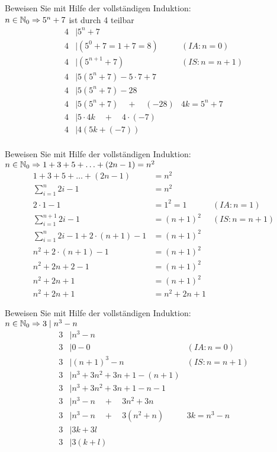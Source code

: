 \begin{card}
  Beweisen Sie mit Hilfe der vollständigen Induktion:\\
  $n \in \mathbb{N}_0 \Rightarrow 5^n + 7$ ist durch 4 teilbar
  \hr
  \begin{align*}
    4 &\mid 5^n + 7 \\
    4 &\mid (5^0 + 7 = 1+7 = 8) & (IA: n=0) \\
    4 &\mid (5^{n+1} + 7) & (IS: n=n+1) \\
    4 &\mid 5 (5^n + 7) - 5 \cdot 7 + 7 & \\
    4 &\mid 5 (5^n + 7) - 28 & \\
    4 &\mid 5 (5^n + 7) \quad + \quad (-28) & 4k = 5^n + 7 \\
    4 &\mid 5 \cdot 4k \quad + \quad 4 \cdot (-7) & \\
    4 &\mid 4(5k + (-7)) & \\
  \end{align*}
\end{card}

\begin{card}
  Beweisen Sie mit Hilfe der vollständigen Induktion:\\
  $n \in \mathbb{N}_0 \Rightarrow 1 + 3 + 5 + \ldots + (2n - 1) = n^2$
  \hr
  \begin{align*}
    1 + 3 + 5 + \ldots + (2n - 1) &= n^2 \\
    \sum\limits_{i=1}^n 2i - 1 &= n^2 \\
    2 \cdot 1 - 1 &= 1^2 = 1 & (IA: n=1) \\
    \sum\limits_{i=1}^{n+1} 2i - 1 &= (n+1)^2 & (IS: n=n+1) \\
    \sum\limits_{i=1}^{n} 2i - 1 + 2 \cdot (n+1) - 1 &= (n+1)^2 & \\
    n^2 + 2 \cdot (n+1) - 1 &= (n+1)^2 & \\
    n^2 + 2n + 2 - 1 &= (n+1)^2 & \\
    n^2 + 2n + 1 &= (n+1)^2 & \\
    n^2 + 2n + 1 &= n^2 + 2n + 1
  \end{align*}
\end{card}

\begin{card}
  Beweisen Sie mit Hilfe der vollständigen Induktion:\\
  $n \in \mathbb{N}_0 \Rightarrow 3 \mid n^3 - n$
  \hr
  \begin{align*}
    3 &\mid n^3 - n & \\
    3 &\mid 0 - 0 & (IA: n=0) \\
    3 &\mid (n+1)^3 - n & (IS: n=n+1) \\
    3 &\mid n^3 + 3n^2 + 3n + 1 - (n+1) & \\
    3 &\mid n^3 + 3n^2 + 3n + 1 - n - 1 & \\
    3 &\mid n^3 - n \quad + \quad 3n^2 + 3n & \\
    3 &\mid n^3 - n \quad + \quad 3(n^2 + n) & 3k = n^3 - n \\
    3 &\mid 3k + 3l & \\
    3 &\mid 3(k + l) & \\
  \end{align*}
\end{card}

